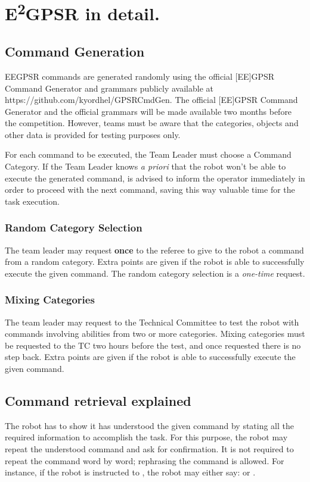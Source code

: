 \chapter[EEGPSR in detail]{E\textsuperscript{2}GPSR in detail.}
\label{chap:eegpsr-appendix}

\section{Command Generation}
EEGPSR commands are generated randomly using the official [EE]GPSR Command Generator and grammars publicly available at https://github.com/kyordhel/GPSRCmdGen. The official [EE]GPSR Command Generator and the official grammars will be made available two months before the competition. However, teams must be aware that the categories, objects and other data is provided for testing purposes only.

For each command to be executed, the Team Leader must choose a Command Category. If the Team Leader knows \textit{a priori} that the robot won't be able to execute the generated command, is advised to inform the operator immediately in order to proceed with the next command, saving this way valuable time for the task execution.

\subsection{Random Category Selection}
The team leader may request \textbf{once} to the referee to give to the robot a command from a random category. Extra points are given if the robot is able to successfully execute the given command. The random category selection is a \textit{one-time} request.

\subsection{Mixing Categories}
The team leader may request to the Technical Committee to test the robot with commands involving abilities from two or more categories. Mixing categories must be requested to the TC two hours before the test, and once requested there is no step back. Extra points are given if the robot is able to successfully execute the given command.


\section{Command retrieval explained}
The robot has to show it has understood the given command by stating all the required information to accomplish the task. For this purpose, the robot may repeat the understood command and ask for confirmation. It is not required to repeat the command word by word; rephrasing the command is allowed. For instance, if the robot is instructed to , the robot may either say: \textit{} or \textit{}.

